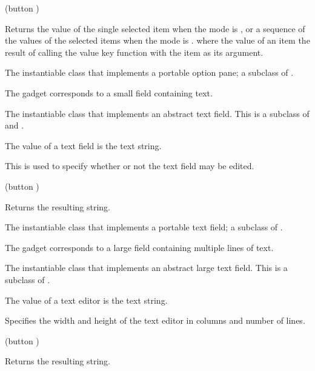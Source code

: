  {(button )}

Returns the value of the single selected item when the mode is
, or a sequence of the values of the selected items
when the mode is .  where the value of an item the
result of calling the value key function with the item as its
argument.


The instantiable class that implements a portable option pane; a subclass of
.



The  gadget corresponds to a small field containing text.


The instantiable class that implements an abstract text field.  This is a subclass of
 and .

The value of a text field is the text string.


This is used to specify whether or not the text field may be edited.

 {(button )}

Returns the resulting string.


The instantiable class that implements a portable text field; a subclass of
.



The  gadget corresponds to a large field containing multiple
lines of text.


The instantiable class that implements an abstract large text field.  This is a
subclass of .

The value of a text editor is the text string.


Specifies the width and height of the text editor in columns and number of lines.

 {(button )}

Returns the resulting string.


